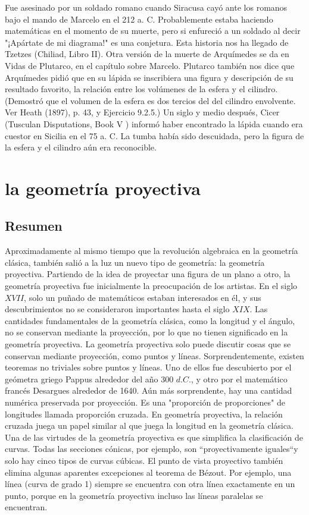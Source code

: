 \documentclass{book}
\begin{document}
    Fue asesinado por un soldado romano cuando Siracusa cayó ante los romanos bajo el mando de Marcelo 
    en el 212 a. C. Probablemente estaba haciendo matemáticas en el momento de su muerte, 
    pero si enfureció a un soldado al decir "¡Apártate de mi diagrama!" es una conjetura. 
    Esta historia nos ha llegado de Tzetzes (Chiliad, Libro II). Otra versión de la muerte de 
    Arquímedes se da en Vidas de Plutarco, en el capítulo sobre Marcelo. Plutarco también nos 
    dice que Arquímedes pidió que en su lápida se inscribiera una figura y descripción de su 
    resultado favorito, la relación entre los volúmenes de la esfera y el cilindro. (Demostró que 
    el volumen de la esfera es dos tercios del del cilindro envolvente. Ver Heath (1897), p. 43, y 
    Ejercicio 9.2.5.) Un siglo y medio después, Cicer (Tusculan Disputations, Book V ) informó haber 
    encontrado la lápida cuando era cuestor en Sicilia en el 75 a. C. La tumba había sido descuidada, 
    pero la figura de la esfera y el cilindro aún era reconocible.
\chapter{la geometría proyectiva}
    \section{Resumen}
    Aproximadamente al mismo tiempo que la revolución algebraica en la geometría clásica, 
    también salió a la luz un nuevo tipo de geometría: la geometría proyectiva. Partiendo de la idea de 
    proyectar una figura de un plano a otro, la geometría proyectiva fue inicialmente la preocupación de los artistas. 
    En el siglo $XVII$, solo un puñado de matemáticos estaban interesados en él, y sus descubrimientos no se 
    consideraron importantes hasta el siglo $XIX$. Las cantidades fundamentales de la geometría clásica, como la 
    longitud y el ángulo, no se conservan mediante la proyección, por lo que no tienen significado en la geometría 
    proyectiva. La geometría proyectiva solo puede discutir cosas que se conservan mediante proyección, 
    como puntos y líneas. Sorprendentemente, existen teoremas no triviales sobre puntos y líneas. Uno de ellos 
    fue descubierto por el geómetra griego Pappus alrededor del año 300 $d.C.$, y otro por el matemático francés 
    Desargues alrededor de 1640. Aún más sorprendente, hay una cantidad numérica preservada por proyección. 
    Es una "proporción de proporciones" de longitudes llamada proporción cruzada. En geometría proyectiva, 
    la relación cruzada juega un papel similar al que juega la longitud en la geometría clásica.
    Una de las virtudes de la geometría proyectiva es que simplifica la clasificación de curvas. 
    Todas las secciones cónicas, por ejemplo, son \textquotedblleft proyectivamente iguales\textquotedblleft y solo hay cinco tipos de curvas cúbicas. 
    El punto de vista proyectivo también elimina algunas aparentes excepciones al teorema de Bézout. Por ejemplo, 
    una línea (curva de grado 1) siempre se encuentra con otra línea exactamente en un punto, porque en la geometría 
    proyectiva incluso las líneas paralelas se encuentran.
\end{document}
